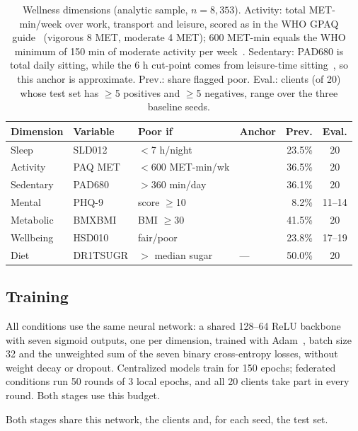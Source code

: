 \begin{table}[t]
\caption{Wellness dimensions (analytic sample, $n=8{,}353$). Activity: total MET-min/week over work, transport and leisure, scored as in the WHO GPAQ guide~\cite{gpaq} (vigorous 8 MET, moderate 4 MET); 600 MET-min equals the WHO minimum of 150 min of moderate activity per week~\cite{who2020}. Sedentary: PAD680 is total daily sitting, while the 6 h cut-point comes from leisure-time sitting~\cite{patel2010}, so this anchor is approximate. Prev.: share flagged poor. Eval.: clients (of 20) whose test set has $\geq$5 positives and $\geq$5 negatives, range over the three baseline seeds.}
\label{tab:dims}
\centering\small
\setlength{\tabcolsep}{1.8pt}
\begin{tabular}{@{}llllr@{\hspace{6pt}}c@{}}
\toprule
Dimension & Variable & Poor if & Anchor & Prev. & Eval. \\
\midrule
Sleep & SLD012 & $<$7 h/night & \cite{watson2015} & 23.5\% & 20 \\
Activity & PAQ MET & $<$600 MET-min/wk & \cite{who2020} & 36.5\% & 20 \\
Sedentary & PAD680 & $>$360 min/day & \cite{patel2010} & 36.1\% & 20 \\
Mental & PHQ-9 & score $\geq$10 & \cite{kroenke2001} & 8.2\% & 11--14 \\
Metabolic & BMXBMI & BMI $\geq$30 & \cite{who2000} & 41.5\% & 20 \\
Wellbeing & HSD010 & fair/poor & \cite{idler1997} & 23.8\% & 17--19 \\
Diet & DR1TSUGR & $>$ median sugar & --- & 50.0\% & 20 \\
\bottomrule
\end{tabular}
\end{table}

\subsection{Training}

All conditions use the same neural network: a shared 128--64 ReLU backbone with seven sigmoid outputs, one per dimension, trained with Adam~\cite{kingma2015}, batch size 32 and the unweighted sum of the seven binary cross-entropy losses, without weight decay or dropout. Centralized models train for 150 epochs; federated conditions run 50 rounds of 3 local epochs, and all 20 clients take part in every round. Both stages use this budget.

Both stages share this network, the clients and, for each seed, the test set.

